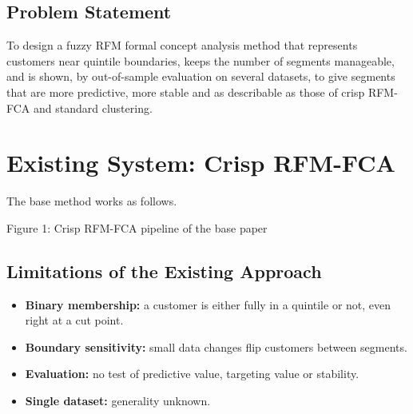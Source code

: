 \documentclass[11pt,a4paper]{article}
\newcommand{\flowitem}[2]{\textbf{#1}\\#2}
\begin{document}
\subsection{Problem Statement}
\begin{statementbox}
To design a fuzzy RFM formal concept analysis method that represents customers near quintile boundaries, keeps the number of segments manageable, and is shown, by out-of-sample evaluation on several datasets, to give segments that are more predictive, more stable and as describable as those of crisp RFM-FCA and standard clustering.
\end{statementbox}

\newpage
\section{Existing System: Crisp RFM-FCA}

The base method \cite{rungruang2024} works as follows.

\begin{center}
\par
\small Figure 1: Crisp RFM-FCA pipeline of the base paper
\end{center}

\subsection{Limitations of the Existing Approach}
\begin{itemize}
\item \textbf{Binary membership:} a customer is either fully in a quintile or not, even right at a cut point.
\item \textbf{Boundary sensitivity:} small data changes flip customers between segments.
\item \textbf{Evaluation:} no test of predictive value, targeting value or stability.
\item \textbf{Single dataset:} generality unknown.
\end{itemize}
\end{document}
